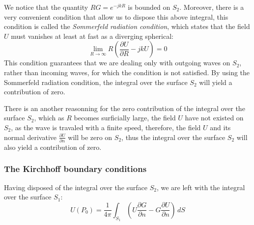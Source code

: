 \documentclass{article}
\begin{document}
We notice that the quantity $RG = e^{-jkR}$ is bounded on $S_2$. Moreover, there is a very convenient condition that allow us to dispose this above integral, this condition is called the \textit{Sommerfeld radiation condition}, which states that the field $U$ must vanishes at least at fast as a diverging spherical:
\begin{equation}\label{eq:sommerfeld_condition}
\lim_{R \to \infty} R \left( \frac{\partial U}{\partial R} - jkU \right) = 0
\end{equation}
This condition guarantees that we are dealing only with outgoing waves on $S_2$, rather than incoming waves, for which the condition is not satisfied. By using the Sommerfeld radiation condition, the integral over the surface $S_2$ will yield a contribution of zero.


There is an another reasonning for the zero contribution of the integral over the surface $S_2$, which as $R$ becomes surficially large, the field $U$ have not existed on  $S_2$, as the wave is travaled with a finite speed, therefore, the field $U$ and its normal derivative $\frac{\partial U}{\partial n}$ will be zero on $S_2$, thus the integral over the surface $S_2$ will also yield a contribution of zero.

\subsubsection{The Kirchhoff boundary conditions}
Having disposed of the integral over the surface $S_2$, we are left with the integral over the surface $S_1$:
\begin{equation}\label{eq:integral_over_S1}
    U(P_0) = \frac{1}{4 \pi} \int_{S_1} \left( U \frac{\partial G}{\partial n} - G \frac{\partial U}{\partial n} \right) \,dS
\end{equation}
\end{document}
